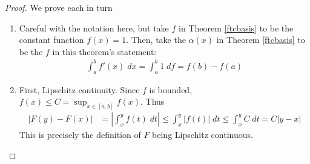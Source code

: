\documentclass[12pt]{book}
\numberwithin{equation}{section} %
\theoremstyle{plain}
\theoremstyle{definition}
\theoremstyle{remark}
\begin{document}
\begin{proof}
We prove each in turn
\begin{enumerate}[label=\Roman*.]
  \item
    Careful with the notation here, but take $f$ in Theorem
    \ref{ftcbasis} to be the constant function $f(x) =1$. Then, take the
    $\alpha(x)$ in Theorem \ref{ftcbasis} to be the $f$ in this
    theorem's statement:
    \begin{align*}
      \int^b_a f'(x) \;dx = \int^b_a 1 \;df = f(b) - f(a)
    \end{align*}
  \item
    First, Lipschitz continuity. Since $f$ is bounded,
    $f(x) \leq C = \sup_{x\in[a,b]} f(x)$.
    Thus
    \begin{align*}
        |F(y) - F(x)| &= \left\lvert \int^y_x f(t)\;dt \right\rvert
            \leq \int^y_x |f(t)|\;dt
        \leq \int^y_x C\;dt = C|y-x|
    \end{align*}
    This is precisely the definition of $F$ being Lipschitz continuous.


\end{enumerate}
\end{proof}
\end{document}

